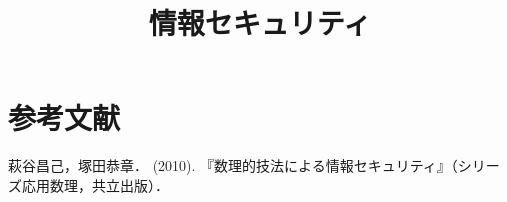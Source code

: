 \documentclass[uplatex,dvipdfmx]{jsreport}
\title{情報セキュリティ}
\author{}
\begin{document}
\tableofcontents

\chapter{参考文献}

\begin{thebibliography}{99}
    萩谷昌己，塚田恭章． (2010). 『数理的技法による情報セキュリティ』（シリーズ応用数理，共立出版）．
\end{thebibliography}
\end{document}

